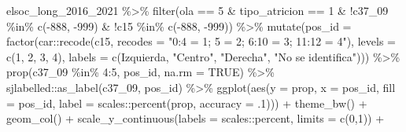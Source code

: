 \documentclass[
  12pt,
]{book}
\newenvironment{Shaded}{\begin{snugshade}}{\end{snugshade}}
\newcommand{\AttributeTok}[1]{\textcolor[rgb]{0.77,0.63,0.00}{#1}}
\newcommand{\ConstantTok}[1]{\textcolor[rgb]{0.00,0.00,0.00}{#1}}
\newcommand{\DecValTok}[1]{\textcolor[rgb]{0.00,0.00,0.81}{#1}}
\newcommand{\FunctionTok}[1]{\textcolor[rgb]{0.00,0.00,0.00}{#1}}
\newcommand{\NormalTok}[1]{#1}
\newcommand{\SpecialCharTok}[1]{\textcolor[rgb]{0.00,0.00,0.00}{#1}}
\newcommand{\StringTok}[1]{\textcolor[rgb]{0.31,0.60,0.02}{#1}}
\begin{document}
\begin{Shaded}
\begin{Highlighting}[]
\NormalTok{elsoc\_long\_2016\_2021 }\SpecialCharTok{\%\textgreater{}\%} 
  \FunctionTok{filter}\NormalTok{(ola }\SpecialCharTok{==} \DecValTok{5} \SpecialCharTok{\&}\NormalTok{ tipo\_atricion }\SpecialCharTok{==} \DecValTok{1} \SpecialCharTok{\&} 
           \SpecialCharTok{!}\NormalTok{c37\_09 }\SpecialCharTok{\%in\%} \FunctionTok{c}\NormalTok{(}\SpecialCharTok{{-}}\DecValTok{888}\NormalTok{, }\SpecialCharTok{{-}}\DecValTok{999}\NormalTok{) }\SpecialCharTok{\&} \SpecialCharTok{!}\NormalTok{c15 }\SpecialCharTok{\%in\%} \FunctionTok{c}\NormalTok{(}\SpecialCharTok{{-}}\DecValTok{888}\NormalTok{, }\SpecialCharTok{{-}}\DecValTok{999}\NormalTok{)) }\SpecialCharTok{\%\textgreater{}\%} 
    \FunctionTok{mutate}\NormalTok{(}\AttributeTok{pos\_id =} \FunctionTok{factor}\NormalTok{(car}\SpecialCharTok{::}\FunctionTok{recode}\NormalTok{(c15, }\AttributeTok{recodes =} \StringTok{"0:4 = 1; 5 = 2; 6:10 = 3; 11:12 = 4"}\NormalTok{),}
                         \AttributeTok{levels =} \FunctionTok{c}\NormalTok{(}\DecValTok{1}\NormalTok{, }\DecValTok{2}\NormalTok{, }\DecValTok{3}\NormalTok{, }\DecValTok{4}\NormalTok{),}
                         \AttributeTok{labels =} \FunctionTok{c}\NormalTok{(}\StringTok{\textquotesingle{}Izquierda\textquotesingle{}}\NormalTok{, }\StringTok{"Centro"}\NormalTok{, }\StringTok{"Derecha"}\NormalTok{, }\StringTok{"No se identifica"}\NormalTok{))) }\SpecialCharTok{\%\textgreater{}\%}
  \FunctionTok{prop}\NormalTok{(c37\_09 }\SpecialCharTok{\%in\%} \DecValTok{4}\SpecialCharTok{:}\DecValTok{5}\NormalTok{, pos\_id, }\AttributeTok{na.rm =} \ConstantTok{TRUE}\NormalTok{) }\SpecialCharTok{\%\textgreater{}\%} 
\NormalTok{  sjlabelled}\SpecialCharTok{::}\FunctionTok{as\_label}\NormalTok{(c37\_09, pos\_id) }\SpecialCharTok{\%\textgreater{}\%} 
  \FunctionTok{ggplot}\NormalTok{(}\FunctionTok{aes}\NormalTok{(}\AttributeTok{y =}\NormalTok{ prop, }\AttributeTok{x =}\NormalTok{ pos\_id, }\AttributeTok{fill =}\NormalTok{ pos\_id, }
               \AttributeTok{label =}\NormalTok{ scales}\SpecialCharTok{::}\FunctionTok{percent}\NormalTok{(prop, }\AttributeTok{accuracy =}\NormalTok{ .}\DecValTok{1}\NormalTok{))) }\SpecialCharTok{+}
  \FunctionTok{theme\_bw}\NormalTok{() }\SpecialCharTok{+} 
    \FunctionTok{geom\_col}\NormalTok{() }\SpecialCharTok{+}
    \FunctionTok{scale\_y\_continuous}\NormalTok{(}\AttributeTok{labels =}\NormalTok{ scales}\SpecialCharTok{::}\NormalTok{percent, }\AttributeTok{limits =} \FunctionTok{c}\NormalTok{(}\DecValTok{0}\NormalTok{,}\DecValTok{1}\NormalTok{)) }\SpecialCharTok{+} 

\end{Highlighting}
\end{Shaded}
\end{document}
